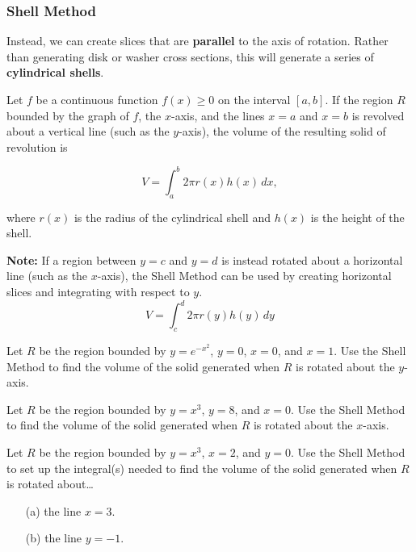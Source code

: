 \documentclass[12pt]{article}
\begin{document}
\subsubsection*{Shell Method}

Instead, we can create slices that are \textbf{parallel} to the axis of rotation. Rather than generating disk or washer cross sections, this will generate a series of \textbf{cylindrical shells}.

\newpage

 {Let $f$ be a continuous function $f(x)\geq 0$ on the interval $[a,b]$. If the region $R$ bounded by the graph of $f$, the $x$-axis, and the lines $x=a$ and $x=b$ is revolved about a vertical line (such as the $y$-axis), the volume of the resulting solid of revolution is

$$V=\int_a^b2\pi r(x)h(x)\,dx,$$

where $r(x)$ is the radius of the cylindrical shell and $h(x)$ is the height of the shell.}

\vspace{5mm}

\textbf{Note:} If a region between $y=c$ and $y=d$ is instead rotated about a horizontal line (such as the $x$-axis), the Shell Method can be used by creating horizontal slices and integrating with respect to $y$.
$$V=\int_c^d 2\pi r(y)h(y)\,dy$$

\Example Let $R$ be the region bounded by $y=e^{-x^2}$, $y=0$, $x=0$, and $x=1$. Use the Shell Method to find the volume of the solid generated when $R$ is rotated about the $y$-axis.

\vspace{5mm}


\newpage

\Example Let $R$ be the region bounded by $y=x^3$, $y=8$, and $x=0$. Use the Shell Method to find the volume of the solid generated when $R$ is rotated about the $x$-axis.

\newpage

\Example Let $R$ be the region bounded by $y=x^3$, $x=2$, and $y=0$. Use the Shell Method to set up the integral(s) needed to find the volume of the solid generated when $R$ is rotated about\dots

\begin{itemize}
\item[(a)] the line $x=3$.

\vspace{95mm}

\item[(b)] the line $y=-1$.
\end{itemize}
\end{document}
